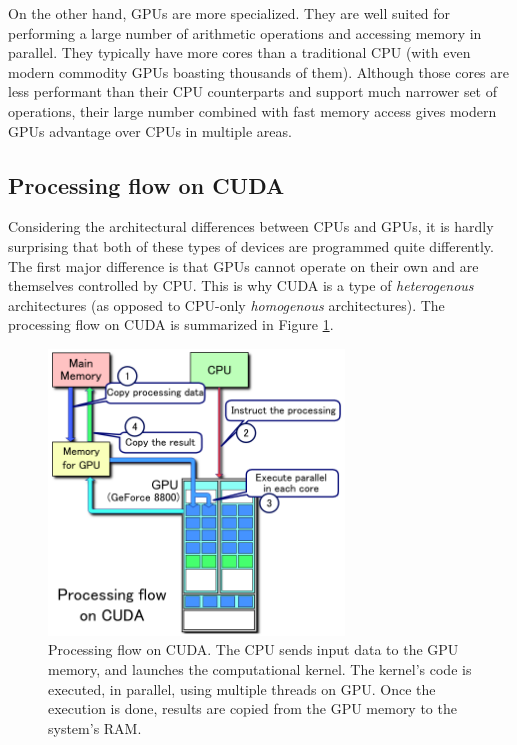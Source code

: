 On the other hand, GPUs are more specialized. They are well suited for performing a large number of arithmetic operations and accessing memory in parallel. They typically have more cores than a traditional CPU (with even modern commodity GPUs boasting thousands of them). Although those cores are less performant than their CPU counterparts and support much narrower set of operations, their large number combined with fast memory access gives modern GPUs advantage over CPUs in multiple areas.

\subsection{Processing flow on CUDA}
Considering the architectural differences between CPUs and GPUs, it is hardly surprising that both of these types of devices are programmed quite differently. The first major difference is that GPUs cannot operate on their own and are themselves controlled by CPU. This is why CUDA is a type of \emph{heterogenous} architectures (as opposed to CPU-only \emph{homogenous} architectures). The processing flow on CUDA is summarized in Figure \ref{fig:cuda_flow}.

\begin{figure}[ht]
    \centering
    \includegraphics[width=0.7\textwidth]{figures/CUDA_processing_flow_(En).png}
    \caption{{\protect{}} Processing flow on CUDA. The CPU sends input data to the GPU memory, and launches the computational kernel. The kernel's code is executed, in parallel, using multiple threads on GPU. Once the execution is done, results are copied from the GPU memory to the system's RAM.}
    \label{fig:cuda_flow}
\end{figure}

